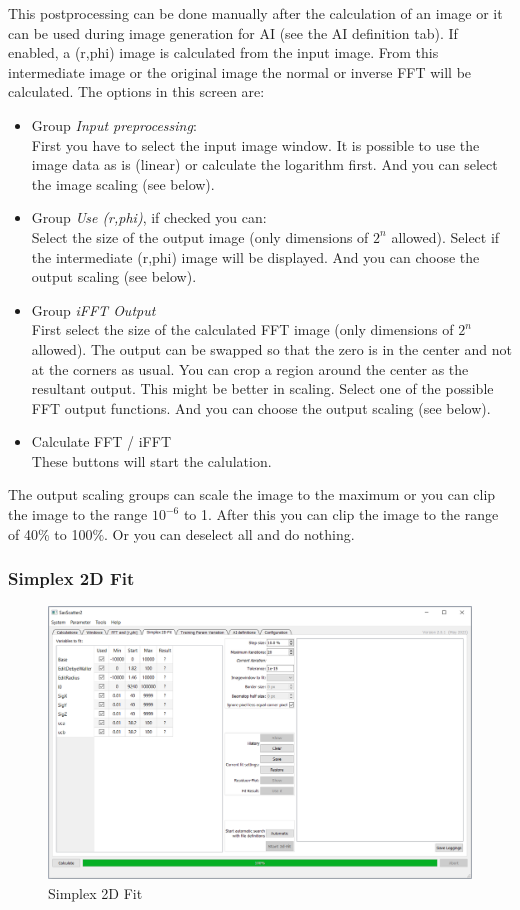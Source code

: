 \documentclass[11pt]{article} %
\begin{document}
This postprocessing can be done manually after the calculation of an image or it can be used during image generation for AI (see the AI definition tab). If enabled, a (r,phi) image is calculated from the input image. From this intermediate image or the original image  the normal or inverse FFT will be calculated. The options in this screen are:
\begin{itemize}\itemsep0pt
\item Group {\it Input preprocessing}: \\
	First you have to select the input image window. 
	It is possible to use the image data as is (linear) or calculate the logarithm first. 
	And you can select the image scaling (see below).
\item Group {\it Use (r,phi)}, if checked you can: \\
	Select the size of the output image (only dimensions of $2^n$ allowed). 
	Select if the intermediate (r,phi) image will be displayed. 
	And you can choose the output scaling (see below).
\item Group {\it iFFT Output} \\
	First select the size of the calculated FFT image (only dimensions of $2^n$ allowed). 
	The output can be swapped so that the zero is in the center and not at the corners as usual. 
	You can crop a region around the center as the resultant output. This might be better in scaling. 
	Select one of the possible FFT output functions. 
	And you can choose the output scaling (see below).
\item Calculate FFT / iFFT \\
	These buttons will start the calulation.
\end{itemize}

The output scaling groups can scale the image to the maximum or you can clip the image to the range $10^{-6}$ to 1. After this you can clip the image to the range of 40\% to 100\%. Or you can deselect all and do nothing.


\subsubsection{Simplex 2D Fit}
\begin{figure}[H]
 \centering
 \includegraphics[width=\textwidth]{gui-fit.png}
 \caption{Simplex 2D Fit}
\end{figure}
\end{document}
